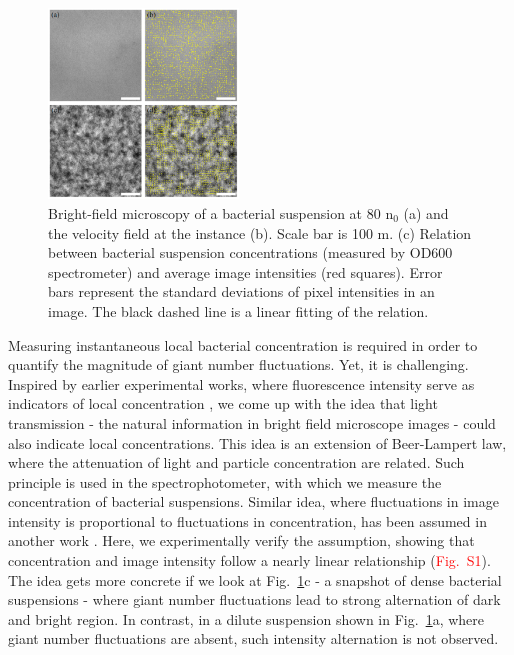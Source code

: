 \documentclass[twocolumn,aps,pre,amsmath,amssymb,longbibliography]{revtex4-1}
\begin{document}
\begin{figure}[h]
\begin{center}
\includegraphics[width=0.45\textwidth]{GNF-figures-1-v2.png}
\caption[]{Bright-field microscopy of a bacterial suspension at 80 n$_0$ (a) and the velocity field at the instance (b). Scale bar is 100 \textmu m. (c) Relation between bacterial suspension concentrations (measured by OD600 spectrometer) and average image intensities (red squares). Error bars represent the standard deviations of pixel intensities in an image. The black dashed line is a linear fitting of the relation. }
\label{fig:1}
\end{center}
\end{figure}

Measuring instantaneous local bacterial concentration is required in order to quantify the magnitude of giant number fluctuations. Yet, it is challenging. Inspired by earlier experimental works, where fluorescence intensity serve as indicators of local concentration \cite{Schaller4488}, we come up with the idea that light transmission - the natural information in bright field microscope images - could also indicate local concentrations. This idea is an extension of Beer-Lampert law, where the attenuation of light and particle concentration are related. Such principle is used in the spectrophotometer, with which we measure the concentration of bacterial suspensions. Similar idea, where fluctuations in image intensity is proportional to fluctuations in concentration, has been assumed in another work \cite{PhysRevLett.106.018101}. Here, we experimentally verify the assumption, showing that concentration and image intensity follow a nearly linear relationship (\textcolor{red}{Fig.~S1}). The idea gets more concrete if we look at Fig.~\ref{fig:1}c - a snapshot of dense bacterial suspensions - where giant number fluctuations lead to strong alternation of dark and bright region. In contrast, in a dilute suspension shown in Fig.~\ref{fig:1}a, where giant number fluctuations are absent, such intensity alternation is not observed.
\end{document}
